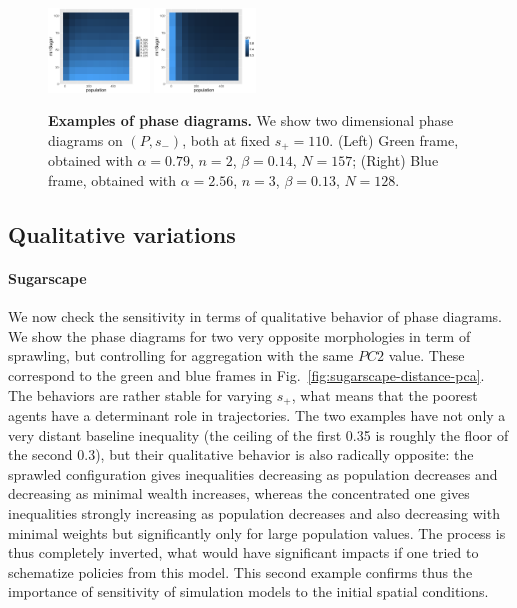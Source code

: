 \documentclass[Afour,sageh,times]{sagej}
\begin{document}


\begin{figure}
\centering
\includegraphics[width=0.24\textwidth]{figures/phasediagram_id27_maxSugar110}
\includegraphics[width=0.24\textwidth]{figures/phasediagram_id0_maxSugar110}
\caption{\textbf{Examples of phase diagrams.} We show two dimensional phase diagrams on $(P,s_-)$, both at fixed $s_+ = 110$. (Left) Green frame, obtained with $\alpha = 0.79$, $n=2$, $\beta = 0.14$, $N=157$; (Right) Blue frame, obtained with $\alpha = 2.56$, $n=3$, $\beta = 0.13$, $N=128$.}
\label{fig:sugarscape-phasediagrams}
\end{figure}


\subsection{Qualitative variations}
\paragraph{Sugarscape} We now check the sensitivity in terms of qualitative behavior of phase diagrams. We show the phase diagrams for two very opposite morphologies in term of sprawling, but controlling for aggregation with the same $PC2$ value. These correspond to the green and blue frames in Fig.~\ref{fig:sugarscape-distance-pca}. The behaviors are rather stable for varying $s_+$, what means that the poorest agents have a determinant role in trajectories. The two examples have not only a very distant baseline inequality (the ceiling of the first 0.35 is roughly the floor of the second 0.3), but their qualitative behavior is also radically opposite: the sprawled configuration gives inequalities decreasing as population decreases and decreasing as minimal wealth increases, whereas the concentrated one gives inequalities strongly increasing as population decreases and also decreasing with minimal weights but significantly only for large population values. The process is thus completely inverted, what would have significant impacts if one tried to schematize policies from this model. This second example confirms thus the importance of sensitivity of simulation models to the initial spatial conditions.
\end{document}
